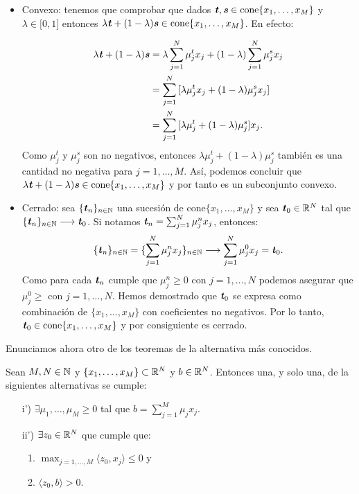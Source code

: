\begin{itemize}
	\item  Convexo: tenemos que comprobar que dados $ \textbf{\emph{t}}, \textbf{\emph{s}} \in \mathrm{cone}\{x_1,\dots, x_M \} $ y $ \lambda \in \lbrack 0,1 \rbrack $ entonces $ \lambda\textbf{\emph{t}} + (1-\lambda)\textbf{\emph{s}} \in \mathrm{cone}\{x_1,\dots, x_M \} $. En efecto:
	
	\begin{equation*}
	\begin{split}
	\lambda\textbf{\emph{t}} + (1-\lambda)\textbf{\emph{s}} &=   \lambda \sum_{j=1}^{N}{\mu_j^t x_j } + (1-\lambda)\sum_{j=1}^{N}{\mu_j^s x_j } \\
	&= \sum_{j=1}^{N}{\lbrack \lambda \mu_j^t x_j  + (1-\lambda)\mu_j^s x_j \rbrack} \\
	&= \sum_{j=1}^{N}{\lbrack \lambda \mu_j^t  + (1-\lambda)\mu_j^s \rbrack x_j}.
	\end{split}
	\end{equation*}
	Como $ \mu_j^t \text{ y } \mu_j^s $ son no negativos, entonces $ \lambda \mu_j^t  + (1-\lambda)\mu_j^s  $ también es una cantidad no negativa para $ j=1,\dots,M $. Así, podemos concluir que $ \lambda\textbf{\emph{t}} + (1-\lambda)\textbf{\emph{s}} \in \mathrm{cone}\{x_1,\dots, x_M \} $ y por tanto es un subconjunto convexo.
	
	\item Cerrado: sea $ \lbrace \textbf{\emph{t}}_n \rbrace_{ n \in \mathbb{N}} $ una sucesión de $ \mathrm{cone}\{x_1,\dots, x_M \} $ y sea $ \textbf{\emph{t}}_0 \in \mathbb{R}^N $ tal que $ \lbrace \textbf{\emph{t}}_n \rbrace_{ n \in \mathbb{N}} \longrightarrow \textbf{\emph{t}}_0 $. Si notamos $ \textbf{\emph{t}}_n = \sum_{j=1}^{N}{\mu_j^n x_j }$, entonces:
	\[
	\lbrace \textbf{\emph{t}}_n \rbrace_{ n \in \mathbb{N}} = \lbrace \sum_{j=1}^{N}{\mu_j^n x_j } \rbrace_{ n \in \mathbb{N}} \longrightarrow \sum_{j=1}^{N}{\mu_j^0 x_j } = \textbf{\emph{t}}_0.
	\]
	Como para cada $ \textbf{\emph{t}}_n $ cumple que $ \mu_j^n \geq 0$ con $ j=1,\dots,N $ podemos asegurar que $ \mu_j^0 \geq $ con $ j=1,\dots,N $. Hemos demostrado que $ \textbf{\emph{t}}_0 $ se expresa como combinación de $ \{x_1,\dots, x_M \} $ con coeficientes no negativos. Por lo tanto, $ \textbf{\emph{t}}_0 \in \mathrm{cone}\{x_1,\dots, x_M \}  $ y por consiguiente es cerrado. 
\end{itemize} 

Enunciamos ahora otro de los teoremas de la alternativa más conocidos.
\bigskip
\begin{lemaBox}[Farkas]
	Sean $ M,N \in \mathbb{N} $ y $ \{x_1,\dots, x_M \} \subset \mathbb{R}^N $ y $ b \in \mathbb{R}^N $. Entonces una, y solo una, de la siguientes alternativas se cumple:
	\begin{itemize}
		\item[i')] $ \exists \mu_1,\dots,\mu_M \geq 0 $ tal que $ b = \sum_{j=1}^{M} \mu_j x_j$.
		\item[ii')]$ \exists z_0 \in \mathbb{R}^N $ que cumple que:
		\begin{enumerate}
			\item $ \displaystyle\max_{ j=1,\dots,M} \langle z_0, x_j \rangle \leq 0$ y
			\item $ \langle z_0, b\rangle > 0$.
		\end{enumerate} 
	\end{itemize}
\end{lemaBox}

